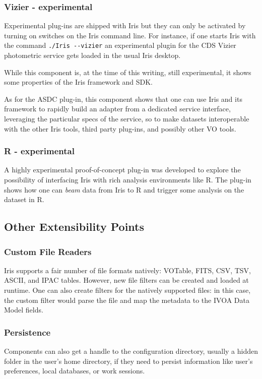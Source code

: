 \documentclass[preprint,12pt,3p]{elsarticle}
\begin{document}
\subsubsection{Vizier - experimental}
\label{sec:asdc}
Experimental plug-ins are shipped with Iris but they can only be activated by turning on switches on the Iris command line. For instance, if one starts Iris with the command \verb|./Iris --vizier| an experimental plugin for the CDS Vizier photometric service gets loaded in the usual Iris desktop.

While this component is, at the time of this writing, still experimental, it shows some properties of the Iris framework and SDK.

As for the ASDC plug-in, this component shows that one can use Iris and its framework to rapidly build an adapter from a dedicated service interface, leveraging the particular specs of the service, so to make datasets interoperable with the other Iris tools, third party plug-ins, and possibly other VO tools.

\subsubsection{R - experimental}
A highly experimental proof-of-concept plug-in was developed to explore the possibility of interfacing Iris with rich analysis environments like R. The plug-in shows how one can \emph{beam} data from Iris to R and trigger some analysis on the dataset in R.


\subsection{Other Extensibility Points}

\subsubsection{Custom File Readers}
Iris supports a fair number of {fi}le formats natively: VOTable,
FITS, CSV, TSV, ASCII, and IPAC tables. However, new {fi}le {fi}lters can be created and
loaded at runtime. One can also create {fi}lters for the natively supported {fi}les: in this
case, the custom {fi}lter would parse the {fi}le and map the metadata to the IVOA Data
Model {fi}elds.

\subsubsection{Persistence}
Components can also get a handle to the configuration directory, usually a hidden folder in the user's home directory, if they need to persist information like user's preferences, local databases, or work sessions.
\end{document}
